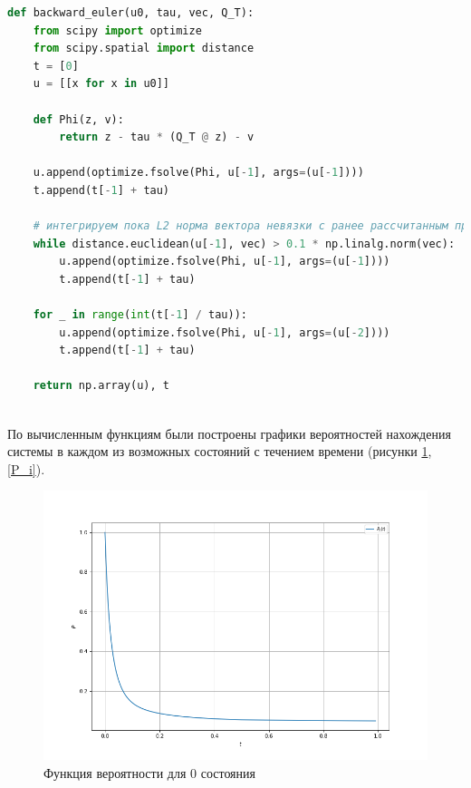 \begin{lstlisting}[language=python, label=eler,caption={\textit{Неявный метод Эйлера}}]
def backward_euler(u0, tau, vec, Q_T):
    from scipy import optimize
    from scipy.spatial import distance
    t = [0]
    u = [[x for x in u0]]

    def Phi(z, v):
        return z - tau * (Q_T @ z) - v

    u.append(optimize.fsolve(Phi, u[-1], args=(u[-1])))
    t.append(t[-1] + tau)

    # интегрируем пока L2 норма вектора невязки с ранее рассчитанным предельным вектором составляла не более 10\% L2 нормы последнего
    while distance.euclidean(u[-1], vec) > 0.1 * np.linalg.norm(vec):
        u.append(optimize.fsolve(Phi, u[-1], args=(u[-1])))
        t.append(t[-1] + tau)

    for _ in range(int(t[-1] / tau)):
        u.append(optimize.fsolve(Phi, u[-1], args=(u[-2])))
        t.append(t[-1] + tau)

    return np.array(u), t
\end{lstlisting}

~\\

По вычисленным функциям были построены графики вероятностей нахождения системы в каждом из возможных состояний с течением времени
(рисунки \ref{P_o}, \ref{P_i}).
\begin{figure}[H]
\centerline{\includegraphics[width=\textwidth]{Images/P_o.png}}
\caption{Функция вероятности для 0 состояния}
\label{P_o}
\end{figure}

